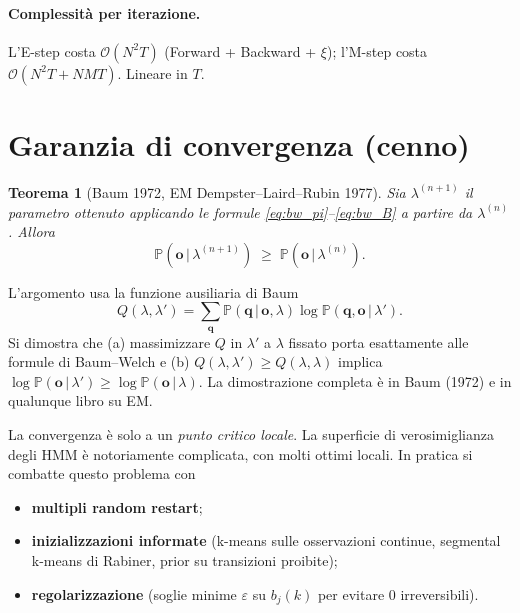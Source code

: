 \documentclass[11pt,a4paper,oneside]{book}
\theoremstyle{plain}
\newtheorem{teorema}{Teorema}[chapter]
\theoremstyle{definition}
\theoremstyle{remark}
\newcommand{\Prob}{\mathbb{P}}
\newcommand{\hmm}{\lambda}                   %
\newcommand{\Nstates}{N}                     %
\newcommand{\Msym}{M}                        %
\newcommand{\Tlen}{T}                        %
\newcommand{\seqobs}{\mathbf{o}}             %
\newcommand{\seqstates}{\mathbf{q}}          %
\newcommand{\xig}{\xi}                       %
\newcommand{\given}{\,\vert\,}
\begin{document}
\paragraph{Complessità per iterazione.} L'E-step costa
$\mathcal{O}(\Nstates^2\Tlen)$ (Forward + Backward + $\xig$); l'M-step
costa $\mathcal{O}(\Nstates^2\Tlen + \Nstates\Msym\Tlen)$. Lineare in
$\Tlen$.

\section{Garanzia di convergenza (cenno)}

\begin{teorema}[Baum 1972, EM Dempster--Laird--Rubin 1977]
Sia $\hmm^{(n+1)}$ il parametro ottenuto applicando le formule
\eqref{eq:bw_pi}--\eqref{eq:bw_B} a partire da $\hmm^{(n)}$. Allora
\begin{equation}
\Prob(\seqobs\given\hmm^{(n+1)}) \;\ge\; \Prob(\seqobs\given\hmm^{(n)}).
\end{equation}
\end{teorema}

L'argomento usa la funzione ausiliaria di Baum
\begin{equation}
Q(\hmm,\hmm') = \sum_{\seqstates}\Prob(\seqstates\given\seqobs,\hmm)
                  \log\Prob(\seqstates,\seqobs\given\hmm').
\end{equation}
Si dimostra che (a) massimizzare $Q$ in $\hmm'$ a $\hmm$ fissato
porta esattamente alle formule di Baum--Welch e (b)
$Q(\hmm,\hmm')\ge Q(\hmm,\hmm)$ implica
$\log\Prob(\seqobs\given\hmm')\ge\log\Prob(\seqobs\given\hmm)$. La
dimostrazione completa è in Baum (1972) e in qualunque libro su EM.

\begin{tcolorbox}[warningbox,title=Massimi locali]
La convergenza è solo a un \emph{punto critico locale}. La superficie
di verosimiglianza degli HMM è notoriamente complicata, con molti
ottimi locali. In pratica si combatte questo problema con
\begin{itemize}[leftmargin=*]
    \item \textbf{multipli random restart};
    \item \textbf{inizializzazioni informate} (k-means sulle
          osservazioni continue, segmental k-means di Rabiner, prior
          su transizioni proibite);
    \item \textbf{regolarizzazione} (soglie minime $\varepsilon$ su
          $b_j(k)$ per evitare $0$ irreversibili).
\end{itemize}
\end{tcolorbox}
\end{document}
